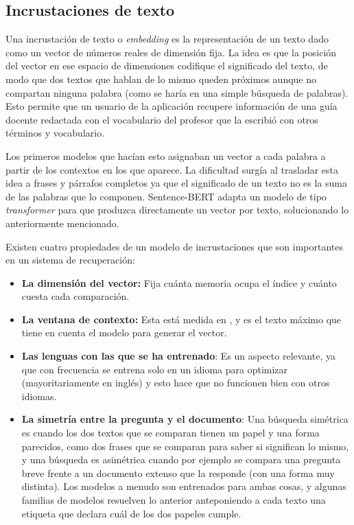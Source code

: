 \subsection[Incrustaciones de texto]{Incrustaciones de texto}
\label{subsec:incrustaciones_concepto}

Una incrustación de texto o \textit{embedding} es la representación de un texto dado como un vector de números reales de dimensión fija. La idea es que la posición del vector en ese espacio de dimensiones codifique el significado del texto, de modo que dos textos que hablan de lo mismo queden próximos aunque no compartan ninguna palabra (como se haría en una simple búsqueda de palabras). Esto permite que un usuario de la aplicación recupere información de una guía docente redactada con el vocabulario del profesor que la escribió con otros términos y vocabulario.

Los primeros modelos que hacían esto asignaban un vector a cada palabra a partir de los contextos en los que aparece\cite{mikolov2013word2vec}. La dificultad surgía al trasladar esta idea a frases y párrafos completos ya que el significado de un texto no es la suma de las palabras que lo componen. Sentence-BERT\cite{reimers2019sbert} adapta un modelo de tipo \textit{transformer}\cite{vaswani2017attention} para que produzca directamente un vector por texto, solucionando lo anteriormente mencionado.

Existen cuatro propiedades de un modelo de incrustaciones que son importantes en un sistema de recuperación:

\begin{itemize}
  \item  \textbf{La dimensión del vector: } Fija cuánta memoria ocupa el índice y cuánto cuesta cada comparación.
  \item  \textbf{La ventana de contexto: } Esta está medida en , y es el texto máximo que tiene en cuenta el modelo para generar el vector.
  \item  \textbf{Las lenguas con las que se ha entrenado}: Es un aspecto relevante, ya que con frecuencia se entrena solo en un idioma para optimizar (mayoritariamente en inglés) y esto hace que no funcionen bien con otros idiomas.
  \item  \textbf{La simetría entre la pregunta y el documento}: Una búsqueda simétrica es cuando los dos textos que se comparan tienen un papel y una forma parecidos, como dos frases que se comparan para saber si significan lo mismo, y una búsqueda es asimétrica cuando por ejemplo se compara una pregunta breve frente a un documento extenso que la responde (con una forma muy distinta). Los modelos a menudo son entrenados para ambas cosas, y algunas familias de modelos resuelven lo anterior anteponiendo a cada texto una etiqueta que declara cuál de los dos papeles cumple.
\end{itemize}

